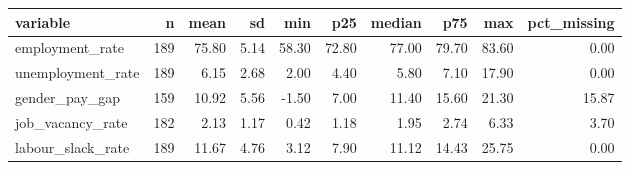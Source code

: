 \begin{tabular}{lrrrrrrrrr}
\toprule
variable & n & mean & sd & min & p25 & median & p75 & max & pct_missing \\
\midrule
employment_rate & 189 & 75.80 & 5.14 & 58.30 & 72.80 & 77.00 & 79.70 & 83.60 & 0.00 \\
unemployment_rate & 189 & 6.15 & 2.68 & 2.00 & 4.40 & 5.80 & 7.10 & 17.90 & 0.00 \\
gender_pay_gap & 159 & 10.92 & 5.56 & -1.50 & 7.00 & 11.40 & 15.60 & 21.30 & 15.87 \\
job_vacancy_rate & 182 & 2.13 & 1.17 & 0.42 & 1.18 & 1.95 & 2.74 & 6.33 & 3.70 \\
labour_slack_rate & 189 & 11.67 & 4.76 & 3.12 & 7.90 & 11.12 & 14.43 & 25.75 & 0.00 \\
\bottomrule
\end{tabular}
